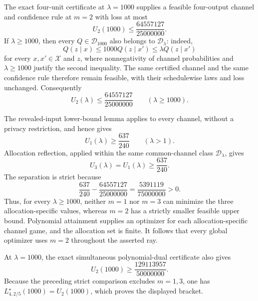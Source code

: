 The exact four-unit certificate at \(\lambda=1000\) supplies a feasible four-output channel and confidence rule at \(m=2\) with loss at most
\[
 U_2(1000)\le \frac{64557127}{25000000}.
\]
If \(\lambda\ge1000\), then every \(Q\in\mathcal D_{1000}\) also belongs to \(\mathcal D_\lambda\): indeed,
\[
 Q(z\mid x)\le1000Q(z\mid x')
 \le\lambda Q(z\mid x')
\]
for every \(x,x'\in\mathcal X\) and \(z\), where nonnegativity of channel probabilities and \(\lambda\ge1000\) justify the second inequality. The same certified channel and the same confidence rule therefore remain feasible, with their schedulewise laws and loss unchanged. Consequently
\[
 U_2(\lambda)\le \frac{64557127}{25000000}
 \qquad(\lambda\ge1000).
\]

The revealed-input lower-bound lemma applies to every channel, without a privacy restriction, and hence gives
\[
 U_1(\lambda)\ge\frac{637}{240}
 \qquad(\lambda>1).
\]
Allocation reflection, applied within the same common-channel class \(\mathcal D_\lambda\), gives
\[
 U_3(\lambda)=U_1(\lambda)\ge\frac{637}{240}.
\]
The separation is strict because
\[
 \frac{637}{240}-\frac{64557127}{25000000}
 =\frac{5391119}{75000000}>0.
\]
Thus, for every \(\lambda\ge1000\), neither \(m=1\) nor \(m=3\) can minimize the three allocation-specific values, whereas \(m=2\) has a strictly smaller feasible upper bound. Polynomial attainment supplies an optimizer for each allocation-specific channel game, and the allocation set is finite. It follows that every global optimizer uses \(m=2\) throughout the asserted ray.

At \(\lambda=1000\), the exact simultaneous polynomial-dual certificate also gives
\[
 U_2(1000)\ge\frac{129113957}{50000000}.
\]
Because the preceding strict comparison excludes \(m=1,3\), one has \(L^\star_{4,2/5}(1000)=U_2(1000)\), which proves the displayed bracket.


